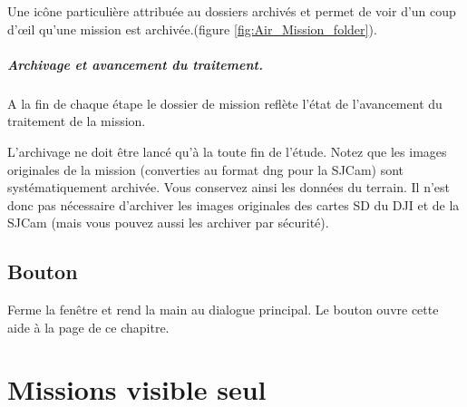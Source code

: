 \documentclass[a4paper,11pt]{report}
\DeclareRobustCommand{\bouton}[1]{\texorpdfstring{\fbox{\small\textsf{#1}}}{#1}}
\begin{document}
 Une icône particulière attribuée au dossiers archivés et permet de voir d'un coup d'\oe il qu'une mission est archivée.(figure \ref{fig:Air_Mission_folder}).


\paragraph{Archivage et avancement du traitement.} A la fin de chaque étape le dossier de mission reflète l'état de l'avancement du traitement de la mission. 

L'archivage ne doit être lancé qu'à la toute fin de l'étude. Notez que les images originales de la mission (converties au format dng pour la SJCam) sont systématiquement archivée. Vous conservez ainsi les données du terrain. Il n'est donc pas nécessaire d'archiver les images originales des cartes SD du DJI et de la SJCam (mais vous pouvez aussi les archiver par sécurité).

\section{Bouton \bouton{Close}}\label{btn:step7_close}
Ferme la fenêtre et rend la main au dialogue principal. Le bouton \bouton{?} ouvre cette aide à la page de ce chapitre.

\chapter{Missions visible seul}\label{ch:visible_only}
\end{document}
